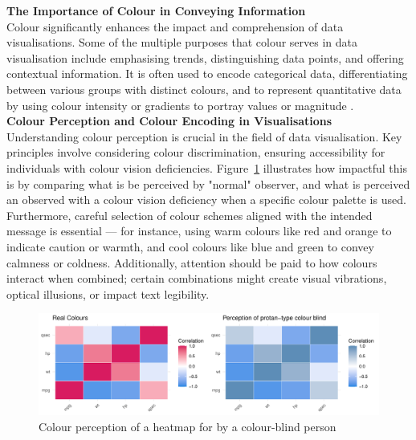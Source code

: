 \documentclass{article}\usepackage[]{graphicx}\usepackage[]{xcolor}
\makeatletter
\def\maxwidth{ %
  \ifdim\Gin@nat@width>\linewidth
    \linewidth
  \else
    \Gin@nat@width
  \fi
}
\newenvironment{knitrout}{}{} %
\numberwithin{equation}{section}
\makeatother
\begin{document}
\noindent \textbf{The Importance of Colour in Conveying Information}\\
Colour significantly enhances the impact and comprehension of data visualisations. Some of the multiple purposes that colour serves in data visualisation include emphasising trends, distinguishing data points, and offering contextual information. It is often used to encode categorical data, differentiating between various groups with distinct colours, and to represent quantitative data by using colour intensity or gradients to portray values or magnitude \cite{healy2018data}.\\

\noindent \textbf{Colour Perception and Colour Encoding in Visualisations}\\
Understanding colour perception is crucial in the field of data visualisation. Key principles involve considering colour discrimination, ensuring accessibility for individuals with colour vision deficiencies. Figure~\ref{fig:colour-plot} illustrates how impactful this is by comparing what is be perceived by "normal" observer, and what is perceived an observed with a colour vision deficiency when a specific colour palette is used. Furthermore, careful selection of colour schemes aligned with the intended message is essential — for instance, using warm colours like red and orange to indicate caution or warmth, and cool colours like blue and green to convey calmness or coldness. Additionally, attention should be paid to how colours interact when combined; certain combinations might create visual vibrations, optical illusions, or impact text legibility.\\

\begin{knitrout}\scriptsize
{}\color{fgcolor}\begin{figure}[H]

{\centering \includegraphics[width=\maxwidth]{figure/beamer-colour-plot-1} 

}

\caption[Colour perception of a heatmap for by a colour-blind person]{Colour perception of a heatmap for by a colour-blind person}\label{fig:colour-plot}
\end{figure}

\end{knitrout}
\end{document}
